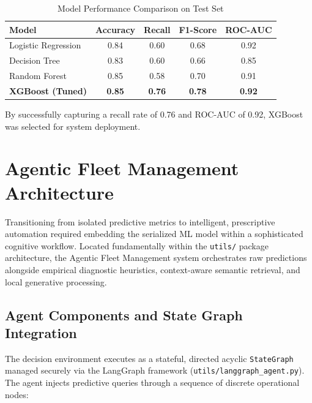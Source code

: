 \documentclass[12pt, a4paper]{article}
\begin{document}
\begin{table}[H]
\centering
\caption{Model Performance Comparison on Test Set}
\begin{tabular}{lcccc}
\toprule
Model & Accuracy & Recall & F1-Score & ROC-AUC \\
\midrule
Logistic Regression & 0.84 & 0.60 & 0.68 & 0.92 \\
Decision Tree & 0.83 & 0.60 & 0.66 & 0.85 \\
Random Forest & 0.85 & 0.58 & 0.70 & 0.91 \\
\rowcolor{solarblue!8}
\textbf{XGBoost (Tuned)} & \textbf{0.85} & \textbf{0.76} & \textbf{0.78} & \textbf{0.92} \\
\bottomrule
\end{tabular}
\end{table}

By successfully capturing a recall rate of 0.76 and ROC-AUC of 0.92, XGBoost was selected for system deployment.

\newpage
\section{Agentic Fleet Management Architecture}

Transitioning from isolated predictive metrics to intelligent, prescriptive automation required embedding the serialized ML model within a sophisticated cognitive workflow. Located fundamentally within the \texttt{utils/} package architecture, the Agentic Fleet Management system orchestrates raw predictions alongside empirical diagnostic heuristics, context-aware semantic retrieval, and local generative processing.

\subsection{Agent Components and State Graph Integration}

The decision environment executes as a stateful, directed acyclic \texttt{StateGraph} managed securely via the LangGraph framework (\texttt{utils/langgraph\_agent.py}). The agent injects predictive queries through a sequence of discrete operational nodes:
\end{document}
